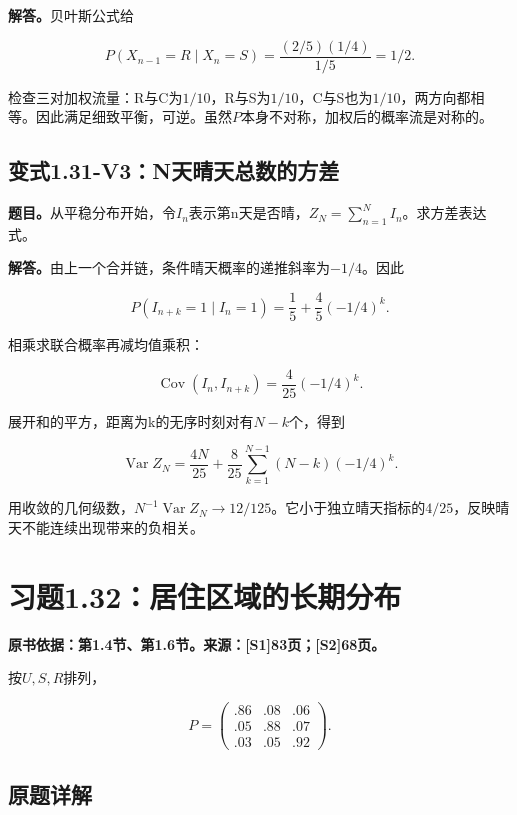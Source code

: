 \documentclass[
  11pt,
  a4paper,
  UTF8,
  fontset=fandol]{ctexart}
\begin{document}
\textbf{解答。}贝叶斯公式给

\[
P(X_{n-1}=R\mid X_n=S)=\frac{(2/5)(1/4)}{1/5}=\boxed{1/2}.
\]

检查三对加权流量：R与C为\(1/10\)，R与S为\(1/10\)，C与S也为\(1/10\)，两方向都相等。因此满足细致平衡，可逆。虽然\(P\)本身不对称，加权后的概率流是对称的。

\subsection{变式1.31-V3：N天晴天总数的方差}\label{ux53d8ux5f0f1.31-v3nux5929ux6674ux5929ux603bux6570ux7684ux65b9ux5dee}

\textbf{题目。}从平稳分布开始，令\(I_n\)表示第n天是否晴，\(Z_N=\sum_{n=1}^NI_n\)。求方差表达式。

\textbf{解答。}由上一个合并链，条件晴天概率的递推斜率为\(-1/4\)。因此

\[
P(I_{n+k}=1\mid I_n=1)=\frac15+\frac45(-1/4)^k.
\]

相乘求联合概率再减均值乘积：

\[
\operatorname{Cov}(I_n,I_{n+k})=\frac4{25}(-1/4)^k.
\]

展开和的平方，距离为k的无序时刻对有\(N-k\)个，得到

\[
\boxed{\operatorname{Var}Z_N=\frac{4N}{25}
+\frac8{25}\sum_{k=1}^{N-1}(N-k)(-1/4)^k.}
\]

用收敛的几何级数，\(N^{-1}\operatorname{Var}Z_N\to12/125\)。它小于独立晴天指标的\(4/25\)，反映晴天不能连续出现带来的负相关。

\section{习题1.32：居住区域的长期分布}\label{ux4e60ux98981.32ux5c45ux4f4fux533aux57dfux7684ux957fux671fux5206ux5e03}

\textbf{原书依据：第1.4节、第1.6节。来源：{[}S1{]}83页；{[}S2{]}68页。}

按\(U,S,R\)排列，

\[
P=\begin{pmatrix}.86&.08&.06\\.05&.88&.07\\.03&.05&.92\end{pmatrix}.
\]

\subsection{原题详解}\label{ux539fux9898ux8be6ux89e3-2}
\end{document}
